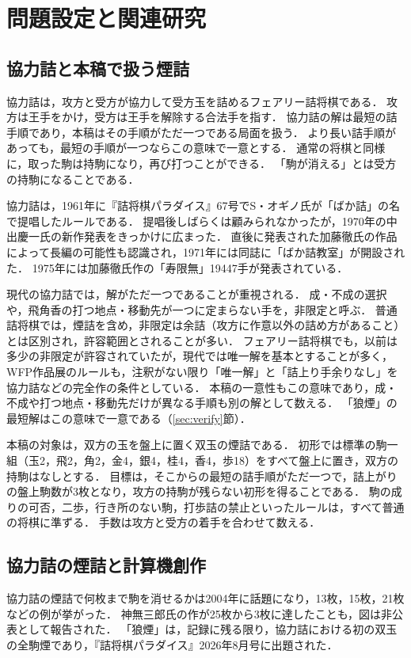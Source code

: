 \documentclass[english,submit]{ipsj}
\begin{document}
\section{問題設定と関連研究}
\subsection{協力詰と本稿で扱う煙詰}
協力詰は，攻方と受方が協力して受方玉を詰めるフェアリー詰将棋である．
攻方は王手をかけ，受方は王手を解除する合法手を指す．
協力詰の解は最短の詰手順であり\cite{wfprule}，本稿はその手順がただ一つである局面を扱う．
より長い詰手順があっても，最短の手順が一つならこの意味で一意とする．
通常の将棋と同様に，取った駒は持駒になり，再び打つことができる．
「駒が消える」とは受方の持駒になることである．

協力詰は，1961年に『詰将棋パラダイス』67号でS・オギノ氏が「ばか詰」の名で提唱したルールである\cite{kanna}．
提唱後しばらくは顧みられなかったが，1970年の中出慶一氏の新作発表をきっかけに広まった\cite{kanna}．
直後に発表された加藤徹氏の作品によって長編の可能性も認識され，1971年には同誌に「ばか詰教室」が開設された\cite{kanna}．
1975年には加藤徹氏作の「寿限無」19447手が発表されている\cite{kanna}．

現代の協力詰では，解がただ一つであることが重視される．
成・不成の選択や，飛角香の打つ地点・移動先が一つに定まらない手を，非限定と呼ぶ．
普通詰将棋では，煙詰を含め，非限定は余詰（攻方に作意以外の詰め方があること）とは区別され，許容範囲とされることが多い\cite{sumaho,komai2025}．
フェアリー詰将棋でも，以前は多少の非限定が許容されていたが，現代では唯一解を基本とすることが多く\cite{komai2025}，WFP作品展のルールも，注釈がない限り「唯一解」と「詰上り手余りなし」を協力詰などの完全作の条件としている\cite{wfprule}．
本稿の一意性もこの意味であり，成・不成や打つ地点・移動先だけが異なる手順も別の解として数える．
「狼煙」の最短解はこの意味で一意である（\ref{sec:verify}節）．

本稿の対象は，双方の玉を盤上に置く双玉の煙詰である．
初形では標準の駒一組（玉2，飛2，角2，金4，銀4，桂4，香4，歩18）をすべて盤上に置き，双方の持駒はなしとする．
目標は，そこからの最短の詰手順がただ一つで，詰上がりの盤上駒数が3枚となり，攻方の持駒が残らない初形を得ることである．
駒の成りの可否，二歩，行き所のない駒，打歩詰の禁止といったルールは，すべて普通の将棋に準ずる．
手数は攻方と受方の着手を合わせて数える．

\subsection{協力詰の煙詰と計算機創作}
協力詰の煙詰で何枚まで駒を消せるかは2004年に話題になり，13枚，15枚，21枚などの例が挙がった\cite{tetsu2004}．
神無三郎氏の作が25枚から3枚に達したことも，図は非公表として報告された\cite{tetsu2004,wfp186}．
「狼煙」は，記録に残る限り，協力詰における初の双玉の全駒煙であり，『詰将棋パラダイス』2026年8月号に出題された．
\end{document}
